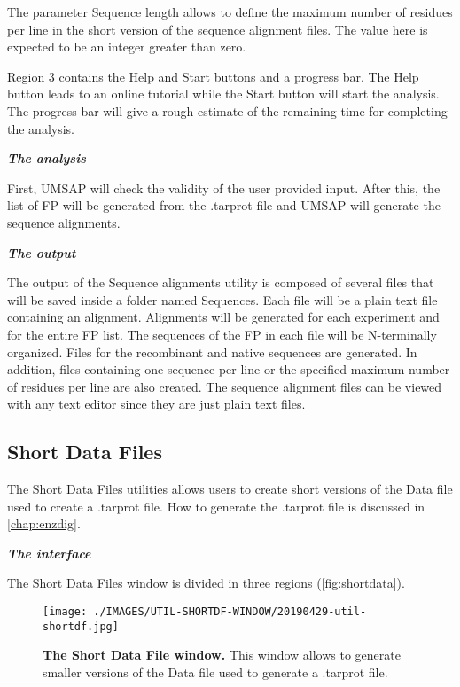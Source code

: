 The parameter Sequence length allows to define the maximum number of residues per line in the short version of the sequence alignment files. The value here is expected to be an integer greater than zero.

Region \num{3} contains the Help and Start buttons and a progress bar. The Help button leads to an online tutorial while the Start button will start the analysis. The progress bar will give a rough estimate of the remaining time for completing the analysis.

\textit{\textbf{The analysis}}

First, UMSAP will check the validity of the user provided input. After this, the list of FP will be generated from the .tarprot file and UMSAP will generate the sequence alignments.

\textit{\textbf{The output}}

The output of the Sequence alignments utility is composed of several files that will be saved inside a folder named Sequences. Each file will be a plain text file containing an alignment. Alignments will be generated for each experiment and for the entire FP list. The sequences of the FP in each file will be N-terminally organized. Files for the recombinant and native sequences are generated. In addition, files containing one sequence per line or the specified maximum number of residues per line are also created. The sequence alignment files can be viewed with any text editor since they are just plain text files.

\subsection{Short Data Files}
\label{subsec:shortDF}

The Short Data Files utilities allows users to create short versions of the Data file used to create a .tarprot file. How to generate the .tarprot file is discussed in \autoref{chap:enzdig}.

\textit{\textbf{The interface}}

The Short Data Files window is divided in three regions (\autoref{fig:shortdata}).

\begin{figure}[h]
	\centering
	\texttt{[image: ./IMAGES/UTIL-SHORTDF-WINDOW/20190429-util-shortdf.jpg]}	    
	\caption[The Short Data File window]{\textbf{The Short Data File window.} This window allows to generate smaller versions of the Data file used to generate a .tarprot file.} 
	\label{fig:shortdata}
	\vspace{-5pt} 	
\end{figure} 

